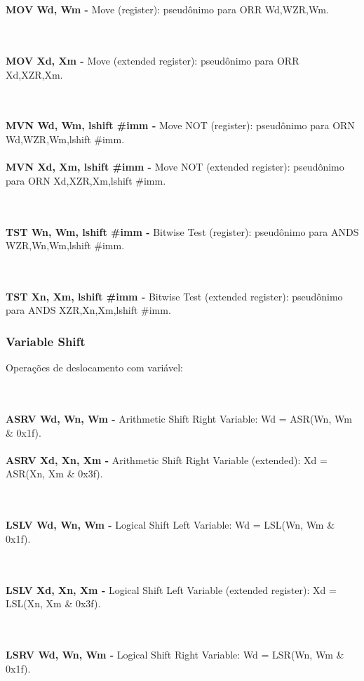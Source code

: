 \documentclass[12pt,a4paper,utf8]{ppgsi}
\begin{document}
\\\\\textbf{MOV Wd, Wm -} Move (register): pseudônimo para ORR Wd,WZR,Wm. 

\\\\\textbf{MOV Xd, Xm -} Move (extended register): pseudônimo para ORR Xd,XZR,Xm. 

\\\\\textbf{MVN Wd, Wm{, lshift \#imm} -} Move NOT (register): pseudônimo para ORN Wd,WZR,Wm{,lshift \#imm}. 
\\\\\textbf{MVN Xd, Xm{, lshift \#imm} -} Move NOT (extended register): pseudônimo para ORN Xd,XZR,Xm{,lshift \#imm}. 

\\\\\textbf{TST Wn, Wm{, lshift \#imm} -} Bitwise Test (register): pseudônimo para ANDS WZR,Wn,Wm{,lshift \#imm}. 

\\\\\textbf{TST Xn, Xm{, lshift \#imm} -} Bitwise Test (extended register): pseudônimo para ANDS XZR,Xn,Xm{,lshift \#imm}. 


\subsubsection{Variable Shift}
Operações de deslocamento com variável:

\\\\\textbf{ASRV Wd, Wn, Wm -} Arithmetic Shift Right Variable: Wd = ASR(Wn, Wm \& 0x1f).
\\\\\textbf{ASRV Xd, Xn, Xm -} Arithmetic Shift Right Variable (extended): Xd = ASR(Xn, Xm \& 0x3f). 

\\\\\textbf{LSLV Wd, Wn, Wm -} Logical Shift Left Variable: Wd = LSL(Wn, Wm \& 0x1f). 

\\\\\textbf{LSLV Xd, Xn, Xm -} Logical Shift Left Variable (extended register): Xd = LSL(Xn, Xm \& 0x3f). 

\\\\\textbf{LSRV Wd, Wn, Wm -} Logical Shift Right Variable: Wd = LSR(Wn, Wm \& 0x1f). 
\end{document}
